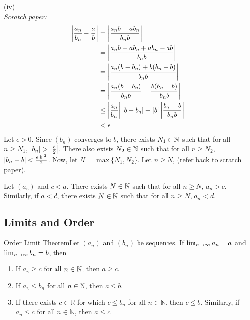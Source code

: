{(iv) \\
\textit{Scratch paper:}
\begin{align*}
    \left|\frac{a_n}{b_n} - \frac{a}{b}\right| & = \left|\frac{a_nb - ab_n}{b_nb}\right|                                                     \\
                                           & = \left|\frac{a_nb - ab_n + ab_n - ab}{b_nb}\right|                                         \\
                                           & = \left|\frac{a_n(b - b_n) + b(b_n - b)}{b_nb}\right|                                       \\
                                           & = \left|\frac{a_n(b - b_n)}{b_nb} + \frac{b(b_n - b)}{b_nb}\right|                          \\
                                           & \leq \left|\frac{a_n}{b_n}\right|\left|b - b_n\right| + \left|b\right|\left|\frac{b_n - b}{b_nb}\right| \\
                                           & < \epsilon
\end{align*}
Let \(\epsilon > 0\). Since \((b_n)\) converges to \(b\), there exists \(N_1 \in \mathbb{N}\) such that for all \(n \geq N_1\), \(\left|b_n \right| > \left|\frac{b}{2}\right|\). There also exists \(N_2 \in \mathbb{N}\) such that for all \(n \geq N_2\), \(\left|b_n - b\right| < \frac{\epsilon|b|^{2}}{2}\). Now, let \(N = \max\{N_1, N_2\}\). Let \(n \geq N\), (refer back to scratch paper). \qedhere
}

\begin{lemma}
    Let \((a_n)\) and \(c < a\). There exists \(N \in \mathbb{N}\) such that for all \(n \geq N\), \(a_n > c\). Similarly, if \(a < d\), there exists \(N \in \mathbb{N}\) such that for all \(n \geq N\), \(a_n < d\).
\end{lemma}

\subsection{Limits and Order}

\begin{ntheorem}
    {Order Limit Theorem}Let \((a_n)\) and \((b_n)\) be sequences. If \(\lim_{n \rightarrow \infty}a_n = a\) and \(\lim_{n \rightarrow \infty}b_n = b\), then
    \begin{enumerate}[label=(\roman*)]
        \item If \(a_n \geq c\) for all \(n \in \mathbb{N}\), then \(a \geq c\).
        \item If \(a_n \leq b_n\) for all \(n \in \mathbb{N}\), then \(a \leq b\).
        \item If there exists \( c \in \mathbb{R} \) for which \( c \leq b_n \) for all \( n \in \mathbb{N} \), then \( c \leq b \). Similarly, if \( a_n \leq c \) for all \( n \in \mathbb{N} \), then \( a \leq c \).

    \end{enumerate}
\end{ntheorem}



